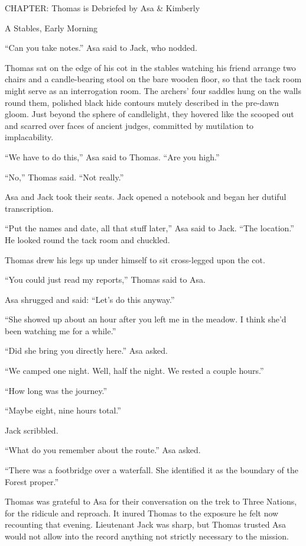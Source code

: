 \documentclass[11pt,a5paper]{article}
\begin{document}
CHAPTER: Thomas is Debriefed by Asa \& Kimberly

A Stables, Early Morning



``Can you take notes.'' Asa said to Jack, who nodded.

Thomas sat on the edge of his cot in the stables watching his friend arrange two chairs and a candle-bearing stool on the bare wooden floor, so that the tack room might serve as an interrogation room. The archers' four saddles hung on the walls round them, polished black hide contours mutely described in the pre-dawn gloom. Just beyond the sphere of candlelight, they hovered like the scooped out and scarred over faces of ancient judges, committed by mutilation to implacability.

``We have to do this,'' Asa said to Thomas. ``Are you high.''

``No,'' Thomas said. ``Not really.''

Asa and Jack took their seats. Jack opened a notebook and began her dutiful transcription.

``Put the names and date, all that stuff later,'' Asa said to Jack. ``The location.'' He looked round the tack room and chuckled.

Thomas drew his legs up under himself to sit cross-legged upon the cot.

``You could just read my reports,'' Thomas said to Asa.

Asa shrugged and said: ``Let's do this anyway.''



``She showed up about an hour after you left me in the meadow. I think she'd been watching me for a while.''

``Did she bring you directly here.'' Asa asked.

``We camped one night. Well, half the night. We rested a couple hours.''

``How long was the journey.''

``Maybe eight, nine hours total.''

Jack scribbled.

``What do you remember about the route.'' Asa asked.

``There was a footbridge over a waterfall. She identified it as the boundary of the Forest proper.''

Thomas was grateful to Asa for their conversation on the trek to Three Nations, for the ridicule and reproach. It inured Thomas to the exposure he felt now recounting that evening. Lieutenant Jack was sharp, but Thomas trusted Asa would not allow into the record anything not strictly necessary to the mission.
\end{document}
